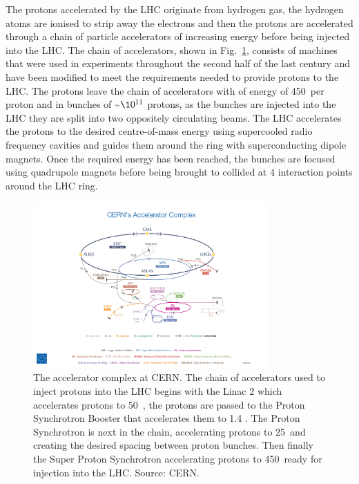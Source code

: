 The protons accelerated by the LHC originate from hydrogen gas, %
the hydrogen atoms are ionised to strip away the electrons and then the protons are accelerated through a chain of particle accelerators of increasing energy before being injected into the LHC. The chain of accelerators, shown in Fig.~\ref{fig:accelerator_chain}, consists of machines that were used in experiments throughout the second half of the last century and have been modified to meet the requirements needed to provide protons to the LHC. The protons leave the chain of accelerators with of energy of 450~\gev per proton and in bunches of \~$\10^{11}$ protons, as the bunches are injected into the LHC they are split into two oppositely circulating beams.
The LHC accelerates the protons to the desired centre-of-mass energy using supercooled radio frequency cavities and guides them around the ring with superconducting dipole magnets. %
Once the required energy has been reached, the bunches are focused using quadrupole magnets before being brought to collided at 4 interaction points around the LHC ring.%

\begin{figure}[htbp!]
  \centering
  \includegraphics[trim = 125mm 2mm 125mm 90mm, clip, width=0.8\textwidth]{./Figs/LHC_LHCb/accelerator_complex.jpg}
  \caption{The accelerator complex at CERN. The chain of accelerators used to inject protons into the LHC begins with the Linac 2 which accelerates protons to 50~\mev, the protons are passed to the Proton Synchrotron Booster that accelerates them to 1.4 \gev. The Proton Synchrotron is next in the chain, accelerating protons to 25~\gev and creating the desired spacing between proton bunches. Then finally the Super Proton Synchrotron accelerating protons to 450~\gev ready for injection into the LHC. Source: CERN.}
  \label{fig:accelerator_chain}
\end{figure}



